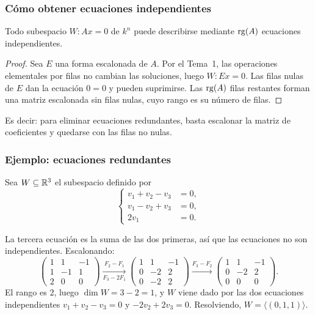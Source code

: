 \begin{frame}
    \frametitle{Cómo obtener ecuaciones independientes}

    \begin{proposition}
        Todo subespacio $W\colon Ax=0$ de $k^n$ puede describirse mediante
        $\operatorname{rg}(A)$ ecuaciones independientes.
    \end{proposition}

    \begin{proof}
        Sea $E$ una forma escalonada de $A$. Por el Tema~1, las operaciones
        elementales por filas no cambian las soluciones, luego
        $W\colon Ex=0$. Las filas nulas de $E$ dan la ecuación
        $0=0$ y pueden suprimirse. Las $\operatorname{rg}(A)$ filas restantes forman una
        matriz escalonada sin filas nulas, cuyo rango es su número de
        filas.
    \end{proof}

    \medskip

    Es decir: para eliminar ecuaciones \alert{redundantes}, basta escalonar
    la matriz de coeficientes y quedarse con las filas no nulas.
\end{frame}


\begin{frame}
    \frametitle{Ejemplo: ecuaciones redundantes}

    \begin{example}
        Sea $W\subseteq\mathbb{R}^3$ el subespacio definido por
        \[
            \left\{
            \begin{aligned}
                v_1+v_2-v_3&=0,\\
                v_1-v_2+v_3&=0,\\
                2v_1&=0.
            \end{aligned}
            \right.
        \]
    \end{example}

    La tercera ecuación es la suma de las dos primeras, así que las
    ecuaciones no son independientes. Escalonando:
    \[
        \begin{pmatrix}1&1&-1\\1&-1&1\\2&0&0\end{pmatrix}
        \xrightarrow[F_3-2F_1]{F_2-F_1}
        \begin{pmatrix}1&1&-1\\0&-2&2\\0&-2&2\end{pmatrix}
        \xrightarrow{F_3-F_2}
        \begin{pmatrix}1&1&-1\\0&-2&2\\0&0&0\end{pmatrix}.
    \]
    El rango es $2$, luego $\dim W=3-2=1$, y $W$ viene dado por las dos
    ecuaciones independientes $v_1+v_2-v_3=0$ y $-2v_2+2v_3=0$.
    Resolviendo, $W=\langle(0,1,1)\rangle$.
\end{frame}


